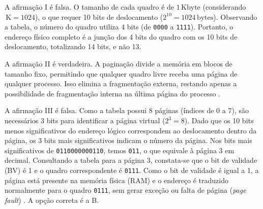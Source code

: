 \documentclass[12pt,a4paper]{article}
\newcommand{\unit}[1]{\,\mathrm{#1}}
\begin{document}
A afirmação I é falsa.
O tamanho de cada quadro é de $1 \unit{Kbyte}$ (considerando $\unit{K} = 1024$),
o que requer 10 bits de deslocamento ($2^{10} = 1024 \unit{bytes}$).
Observando a tabela, o número do quadro utiliza 4 bits (de \texttt{0000} a \texttt{1111}).
Portanto, o endereço físico completo é a junção dos 4 bits do quadro com os 10 bits de deslocamento,
totalizando 14 bits, e não 13.

A afirmação II é verdadeira.
A paginação divide a memória em blocos de tamanho fixo,
permitindo que qualquer quadro livre receba uma página de qualquer processo.
Isso elimina a fragmentação externa,
restando apenas a possibilidade de fragmentação interna na última página do processo \parencite[seç.~3.3, seç.~3.5.3, p.~196]{tanenbaum2016}.

A afirmação III é falsa.
Como a tabela possui 8 páginas (índices de 0 a 7),
são necessários 3 bits para identificar a página virtual ($2^3 = 8$).
Dado que os 10 bits menos significativos do endereço lógico correspondem ao deslocamento dentro da página,
os 3 bits mais significativos indicam o número da página.
Nos bits mais significativos de \texttt{0110000000110}, temos \texttt{011},
o que equivale à página 3 em decimal.
Consultando a tabela para a página 3,
constata-se que o bit de validade (BV) é 1 e o quadro correspondente é \texttt{0111}.
Como o bit de validade é igual a 1,
a página está presente na memória física (RAM) e o endereço é traduzido normalmente para o quadro \texttt{0111},
sem gerar exceção ou falta de página (\textit{page fault}) \parencite[seç.~3.3]{tanenbaum2016}.
A opção correta é a B.
\end{document}
